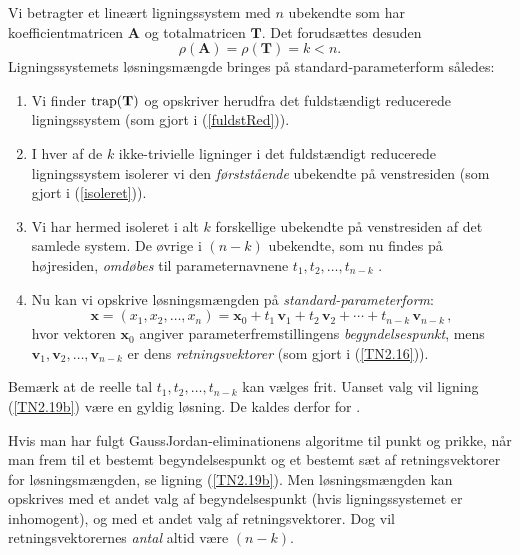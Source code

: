 \begin{method}\label{TN2.19}
Vi betragter et lineært ligningssystem med $n$ ubekendte som har koefficientmatricen $\mathbf{A}$ og totalmatricen $\mathbf{T}$. Det forudsættes desuden
\begin{equation}
\rho(\mathbf A)=\rho(\mathbf T)= k < n.
\end{equation}
Ligningssystemets løsningsmængde bringes på standard-parameterform således:
\begin{enumerate}
\item Vi finder $\mathrm{trap}(\mathbf T)$ og opskriver herudfra det fuldstændigt reducerede lig\-ningssystem (som gjort i (\ref{fuldstRed})).

\item I hver af de $k$ ikke-trivielle ligninger i det fuldstændigt reducerede ligningssy\-stem isolerer vi den \textit{førststående} ubekendte på ven\-stre\-si\-den  (som gjort i (\ref{isoleret})).
\item Vi har hermed isoleret i alt $k$ forskellige ubekendte på venstresiden af det samlede system. De øvrige i $(n-k)$ ubekendte, som nu findes på højresiden, \textit{omdøbes} til parameternavnene $t_1,t_2,\ldots,t_{n-k}$ .
\item
Nu kan vi opskrive løsningsmængden på \textit{standard-parameterform}:
\begin{equation}\label{TN2.19b}
\mathbf x=(x_1,x_2,\ldots , x_n)=\mathbf x_0+t_1\,\mathbf v_1+ t_2\,\mathbf v_2+ \cdots+t_{n-k}\,\mathbf v_{n-k}\,,
\end{equation}
hvor vektoren $\mathbf x_0$ angiver parameterfremstillingens \textit{begyndelsespunkt}, mens $\mathbf v_1,\mathbf v_2,\ldots,\mathbf v_{n-k}$ er dens \textit{retningsvektorer} (som gjort i (\ref{TN2.16})).
\end{enumerate}
Bemærk at de reelle tal $t_1,t_2,\ldots,t_{n-k}$ kan vælges frit. Uanset valg vil ligning (\ref{TN2.19b}) være en gyldig løsning. De kaldes derfor for .


\end{method}

\begin{obs}
Hvis man har fulgt GaussJordan-eliminationens algoritme til punkt og prikke, når man frem til et bestemt begyndelsespunkt og et bestemt sæt af retningsvektorer for løsningsmængden, se ligning (\ref{TN2.19b}). Men løsningsmængden kan opskrives med et andet valg af begyndelsespunkt (hvis ligningssystemet er inhomogent), og med et andet valg af retningsvektorer. Dog vil retningsvektorernes \textit{antal} altid være $(n-k)$. 
\end{obs}


